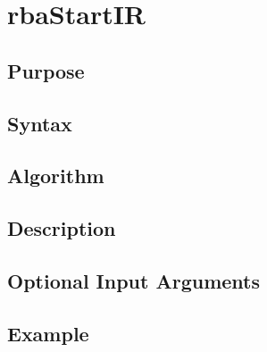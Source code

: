 
\chapter{rbaStartIR} %
\label{cha:rbaStartIR} %

\section{Purpose} %
\label{sec:rbaStartIR_purpose}



\section{Syntax} %
\label{sec:rbaStartIR_syntax}




\section{Algorithm} %
\label{sec:rbaStartIR_algorithm}



\section{Description} %
\label{sec:rbaStartIR_description}



\section{Optional Input Arguments} %
\label{sec:rbaStartIR_optional_input_arguments}



\section{Example} %
\label{sec:rbaStartIR_example}

